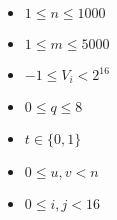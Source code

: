 \begin{itemize}
\tightlist
\item $1 \le n \le 1000$
\item $1 \le m \le 5000$
\item $-1 \le V_i < 2^{16}$
\item $0 \le q \le 8$
\item $t \in \{0, 1\}$
\item $0 \le u, v < n$
\item $0 \le i, j < 16$
\end{itemize}
